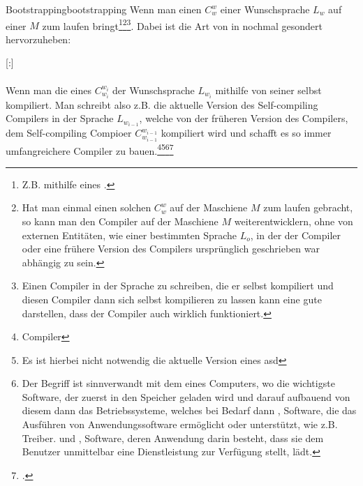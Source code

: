 \begin{Definition}{Bootstrapping}{bootstrapping}
  Wenn man einen  $C_{w}^{w}$ einer Wunschsprache $L_w$ auf einer  $M$ zum laufen bringt\footnote{Z.B. mithilfe eines .}\footnote{Hat man einmal einen solchen  $C_{w}^{w}$ auf der Maschiene $M$ zum laufen gebracht, so kann man den Compiler auf der Maschiene $M$ weiterentwicklern, ohne von externen Entitäten, wie einer bestimmten Sprache $L_o$, in der der Compiler oder eine frühere Version des Compilers ursprünglich geschrieben war abhängig zu sein.}\footnote{Einen Compiler in der Sprache zu schreiben, die er selbst kompiliert und diesen Compiler dann sich selbst kompilieren zu lassen kann eine gute  darstellen, dass der Compiler auch wirklich funktioniert.}. Dabei ist die Art von  in  nochmal gesondert hervorzuheben:

  \titleformat{\paragraph}[runin]{\normalfont\normalsize\bfseries}{}{0mm}{}[:]

  \paragraph{}\label{par:bootstrapping}\hspace{-0.25cm}
  Wenn man die  eines  $C_{w_i}^{w_i}$ der Wunschsprache $L_{w_i}$ mithilfe von  seiner selbst kompiliert. Man schreibt also z.B. die aktuelle Version des Self-compiling Compilers in der Sprache $L_{w_{i-1}}$, welche von der früheren Version des Compilers, dem Self-compiling Compioer $C_{w_{i-1}}^{w_{i-1}}$ kompiliert wird und schafft es so  immer umfangreichere Compiler zu bauen.\footnote{Compiler}\footnote{Es ist hierbei nicht notwendig die aktuelle Version eines  asd}\footnote{Der Begriff ist sinnverwandt mit dem  eines Computers, wo die wichtigste Software, der  zuerst in den Speicher geladen wird und darauf aufbauend von diesem dann das Betriebssysteme, welches bei Bedarf dann , Software, die das Ausführen von Anwendungssoftware ermöglicht oder unterstützt, wie z.B. Treiber. und , Software, deren Anwendung darin besteht, dass sie dem Benutzer unmittelbar eine Dienstleistung zur Verfügung stellt, lädt.}\footcite{earley_formalism_1970}
\end{Definition}

